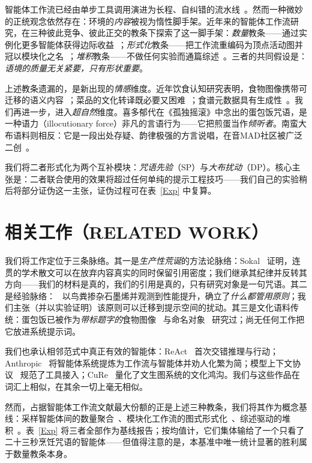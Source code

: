 \documentclass[journal]{IEEEtran}
\begin{document}
智能体工作流已经由单步工具调用演进为长程、自纠错的流水线~\cite{react2022,anthropic2024}。然而一种微妙的正统观念依然存在：环境的\emph{内容}被视为惰性脚手架。近年来的智能体工作流研究，在三种彼此竞争、彼此正交的教条下探索了这一脚手架：\emph{数量}教条——通过实例化更多智能体获得边际收益~\cite{moreagents2024}；\emph{形式化}教条——把工作流重编码为顶点活动图并冠以模块化之名~\cite{flow2025}；\emph{堆积}教条——不做任何实验而通篇综述~\cite{gensurvey2026}。三者的共同假设是：\emph{语境的质量无关紧要，只有形状重要}。

上述教条遗漏的，是新出现的\emph{情感}维度。近年饮食认知研究表明，食物图像携带可迁移的语义内容~\cite{takagi2025}；菜品的文化转译既必要又困难~\cite{khanuja2024}；食谱元数据具有生成性~\cite{watanabe2025}。我们再进一步，进入\emph{超自然}维度。喜多郁代在《孤独摇滚》中念出的蛋包饭咒语，是一种语力（illocutionary force）非凡的言语行为——它把煎蛋当作\emph{倾听者}。南蛮大布语料则相反：它是一段出处存疑、韵律极强的方言说唱，在音MAD社区被广泛二创~\cite{otomadwiki,moegirl2026}。

我们将二者形式化为两个互补模块：\emph{咒语先验}（SP）与\emph{大布扰动}（DP）。核心主张是：二者联合使用的效果将超过任何单纯的提示工程技巧——我们自己的实验稍后将部分证伪这一主张，证伪过程可在表~\ref{Exp} 中复算。

\section{相关工作（RELATED WORK）}

我们将工作定位于三条脉络。其一是\emph{生产性荒诞}的方法论脉络：Sokal~\cite{sokal1996} 证明，连贯的学术散文可以在放弃内容真实的同时保留引用密度；我们继承其纪律并反转其方向——我们的材料是真的，我们的引用是真的，只有研究对象是一句咒语。其二是经验脉络：~\cite{pumera2020} 以鸟粪掺杂石墨烯并观测到性能提升，确立了\emph{什么都管用原则}；我们主张（并以实验证明）该原则可以迁移到提示空间的扰动。其三是文化语料传统：蛋包饭已被作为\emph{带标题字的}食物图像~\cite{takagi2025} 与命名对象~\cite{watanabe2025} 研究过；尚无任何工作把它放进系统提示词。

我们也承认相邻范式中真正有效的智能体：ReAct~\cite{react2022} 首次交错推理与行动；Anthropic~\cite{anthropic2024} 将智能体系统提炼为工作流与智能体并劝人化繁为简；模型上下文协议~\cite{mcp2024} 规范了工具接入；CuRe~\cite{cure2025} 量化了文生图系统的文化鸿沟。我们与这些作品在词汇上相似，在其余一切上毫无相似。

然而，占据智能体工作流文献最大份额的正是上述三种教条，我们将其作为概念基线：采样智能体间的数量聚合~\cite{moreagents2024}、模块化工作流的图式形式化~\cite{flow2025}、综述驱动的堆积~\cite{gensurvey2026}。表~\ref{Exp} 将三者全部作为基线报告；按均值计，它们集体输给了一个只看了二十三秒烹饪咒语的智能体——但值得注意的是，本基准中唯一统计显著的胜利属于数量教条本身。
\end{document}
